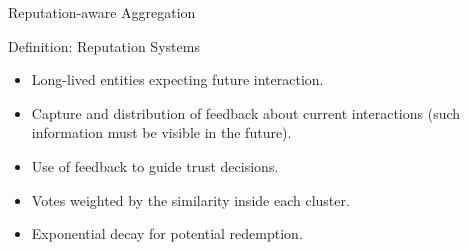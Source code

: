 \begin{frame}{Reputation-aware Aggregation}

  \begin{block}{Definition: Reputation Systems\normalfont~\autocite{resnick_Reputationsystems_2000}}
    \begin{itemize}
      \item Long-lived entities expecting future interaction.
      \item Capture and distribution of feedback about current interactions (such information must be visible in the future).
      \item Use of feedback to guide trust decisions.
    \end{itemize}
  \end{block}

  \pause
  \begin{itemize}
    \item Votes weighted by the similarity inside each cluster.
    \item Exponential decay for potential redemption.
  \end{itemize}


\end{frame}

